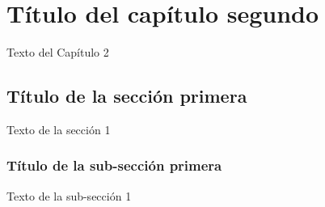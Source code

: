 
\chapter{Título del capítulo segundo}

Texto del Capítulo 2

\section{Título de la sección primera}

Texto de la sección 1


\subsection{Título de la sub-sección primera}

Texto de la sub-sección 1

